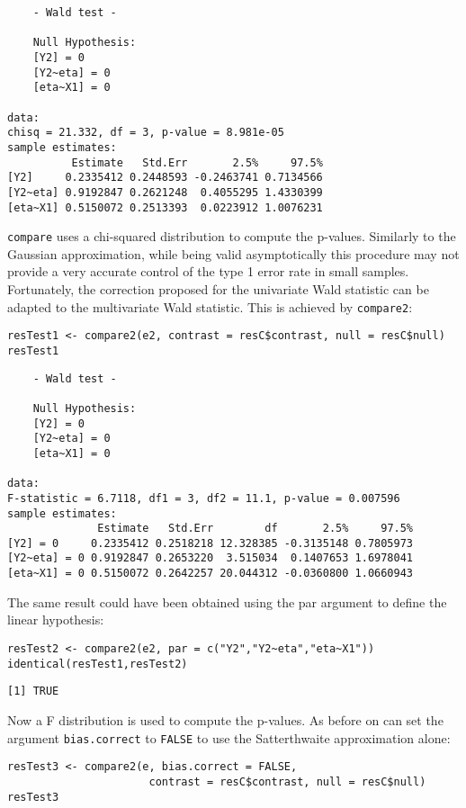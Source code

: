 \documentclass[12pt]{article}
\begin{document}
\begin{verbatim}
	- Wald test -

	Null Hypothesis:
	[Y2] = 0
	[Y2~eta] = 0
	[eta~X1] = 0

data:  
chisq = 21.332, df = 3, p-value = 8.981e-05
sample estimates:
          Estimate   Std.Err       2.5%     97.5%
[Y2]     0.2335412 0.2448593 -0.2463741 0.7134566
[Y2~eta] 0.9192847 0.2621248  0.4055295 1.4330399
[eta~X1] 0.5150072 0.2513393  0.0223912 1.0076231
\end{verbatim}

\texttt{compare} uses a chi-squared distribution to compute the p-values.
Similarly to the Gaussian approximation, while being valid
asymptotically this procedure may not provide a very accurate control
of the type 1 error rate in small samples. Fortunately, the correction
proposed for the univariate Wald statistic can be adapted to the
multivariate Wald statistic. This is achieved by \texttt{compare2}:
\lstset{language=r,label= ,caption= ,captionpos=b,numbers=none}
\begin{lstlisting}
resTest1 <- compare2(e2, contrast = resC$contrast, null = resC$null)
resTest1
\end{lstlisting}

\begin{verbatim}
	- Wald test -

	Null Hypothesis:
	[Y2] = 0
	[Y2~eta] = 0
	[eta~X1] = 0

data:  
F-statistic = 6.7118, df1 = 3, df2 = 11.1, p-value = 0.007596
sample estimates:
              Estimate   Std.Err        df       2.5%     97.5%
[Y2] = 0     0.2335412 0.2518218 12.328385 -0.3135148 0.7805973
[Y2~eta] = 0 0.9192847 0.2653220  3.515034  0.1407653 1.6978041
[eta~X1] = 0 0.5150072 0.2642257 20.044312 -0.0360800 1.0660943
\end{verbatim}

The same result could have been obtained using the par argument to
define the linear hypothesis:
\lstset{language=r,label= ,caption= ,captionpos=b,numbers=none}
\begin{lstlisting}
resTest2 <- compare2(e2, par = c("Y2","Y2~eta","eta~X1"))
identical(resTest1,resTest2)
\end{lstlisting}

\begin{verbatim}
[1] TRUE
\end{verbatim}

Now a F distribution is used to compute the p-values. As before on can
set the argument \texttt{bias.correct} to \texttt{FALSE} to use the Satterthwaite
approximation alone:
\lstset{language=r,label= ,caption= ,captionpos=b,numbers=none}
\begin{lstlisting}
resTest3 <- compare2(e, bias.correct = FALSE, 
					  contrast = resC$contrast, null = resC$null)
resTest3
\end{lstlisting}
\end{document}
